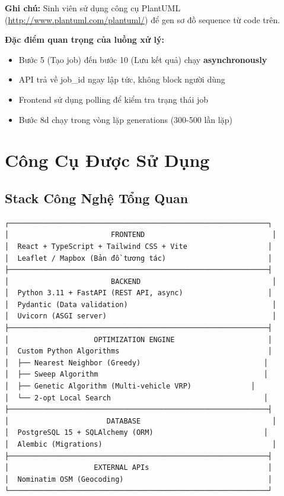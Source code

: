 \documentclass[12pt,a4paper,openany,oneside]{report}
\begin{document}
\textbf{Ghi chú:} Sinh viên sử dụng công cụ PlantUML (\url{http://www.plantuml.com/plantuml/}) để gen sơ đồ sequence từ code trên.

\textbf{Đặc điểm quan trọng của luồng xử lý:}
\begin{itemize}
    \item Bước 5 (Tạo job) đến bước 10 (Lưu kết quả) chạy \textbf{asynchronously}
    \item API trả về job\_id ngay lập tức, không block người dùng
    \item Frontend sử dụng polling để kiểm tra trạng thái job
    \item Bước 8d chạy trong vòng lặp generations (300-500 lần lặp)
\end{itemize}

\section{Công Cụ Được Sử Dụng}

\subsection{Stack Công Nghệ Tổng Quan}

\begin{verbatim}
┌─────────────────────────────────────────────────────────────┐
│                        FRONTEND                              │
│  React + TypeScript + Tailwind CSS + Vite                   │
│  Leaflet / Mapbox (Bản đồ tương tác)                        │
├─────────────────────────────────────────────────────────────┤
│                        BACKEND                               │
│  Python 3.11 + FastAPI (REST API, async)                    │
│  Pydantic (Data validation)                                  │
│  Uvicorn (ASGI server)                                       │
├─────────────────────────────────────────────────────────────┤
│                    OPTIMIZATION ENGINE                      │
│  Custom Python Algorithms                                   │
│  ├── Nearest Neighbor (Greedy)                             │
│  ├── Sweep Algorithm                                       │
│  ├── Genetic Algorithm (Multi-vehicle VRP)              │
│  └── 2-opt Local Search                                    │
├─────────────────────────────────────────────────────────────┤
│                       DATABASE                               │
│  PostgreSQL 15 + SQLAlchemy (ORM)                          │
│  Alembic (Migrations)                                        │
├─────────────────────────────────────────────────────────────┤
│                    EXTERNAL APIs                            │
│  Nominatim OSM (Geocoding)                                  │
└─────────────────────────────────────────────────────────────┘
\end{verbatim}
\end{document}
